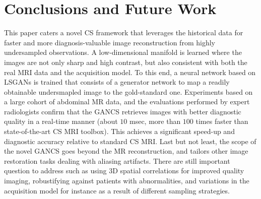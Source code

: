 \documentclass{journal}
\begin{document}
\section{Conclusions and Future Work}
\label{sec:conclusion}
%
This paper caters a novel CS framework that leverages the historical data for faster and more diagnosis-valuable image reconstruction from highly undersampled observations. A low-dimensional manifold is learned where the images are not only sharp and high contrast, but also consistent with both the real MRI data and the acquisition model. To this end, a neural network based on LSGANs is trained that consists of a generator network to map a readily obtainable undersmapled image to the gold-standard one. Experiments based on a large cohort of abdominal MR data, and the evaluations performed by expert radiologists confirm that the GANCS retrieves images with better diagnostic quality in a real-time manner (about $10$ msec, more than $100$ times faster than state-of-the-art CS MRI toolbox). This achieves a significant speed-up and diagnostic accuracy relative to standard CS MRI. Last but not least, the scope of the novel GANCS goes beyond the MR reconstruction, and tailors other image restoration tasks dealing with aliasing artifacts. There are still important question to address such as using 3D spatial correlations for improved quality imaging, robustifying against patients with abnormalities, and variations in the acquisition model for instance as a result of different sampling strategies.
 



%



\newpage

\newpage

\end{document}

